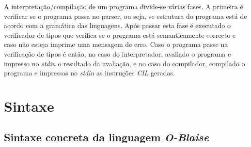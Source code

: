 \vspace{\baselineskip}
A interpretação/compilação de um programa divide-se várias fases. A primeira é 
verificar se o programa passa no parser, ou seja, se estrutura do programa está 
de acordo com a gramática das linguagens. Após passar esta fase é executado o 
verificador de tipos que verifica se o programa está semanticamente correcto e 
caso não esteja imprime uma mensagem de erro. Caso o programa passe na 
verificação de tipos é então, no caso do interpretador, avaliado o programa e 
impresso no \emph{stdin} o resultado da avaliação, e no caso do compilador, 
compilado o programa e impressas no \emph{stdin} as instruções \emph{CIL} 
geradas. 

\newpage
\section{Sintaxe}

\subsection{Sintaxe concreta da linguagem \emph{O-Blaise}}

